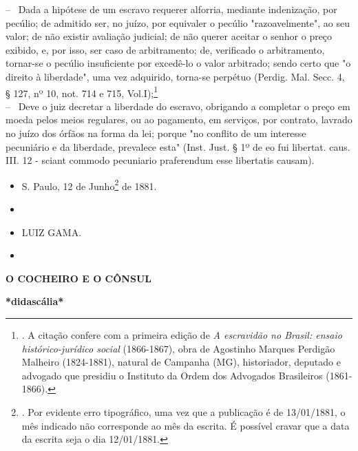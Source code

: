 -- ~Dada a hipótese de um escravo requerer alforria, mediante
indenização, por pecúlio; de admitido ser, no juízo, por equivaler o
pecúlio "razoavelmente", ao seu valor; de não existir avaliação
judicial; de não querer aceitar o senhor o preço exibido, e, por isso,
ser caso de arbitramento; de, verificado o arbitramento, tornar-se o
pecúlio insuficiente por excedê-lo o valor arbitrado; sendo certo que "o
direito à liberdade", uma vez adquirido, torna-se perpétuo (Perdig. Mal.
Secc. 4, § 127, nº 10, not. 714 e 715, Vol.I);\footnote{. A citação
  confere com a primeira edição de \emph{A escravidão no Brasil: ensaio
  histórico-jurídico social} (1866-1867), obra de Agostinho Marques
  Perdigão Malheiro (1824-1881), natural de Campanha (MG), historiador,
  deputado e advogado que presidiu o Instituto da Ordem dos Advogados
  Brasileiros (1861-1866).}\\
-- ~Deve o juiz decretar a liberdade do escravo, obrigando a completar o
preço em moeda pelos meios regulares, ou ao pagamento, em serviços, por
contrato, lavrado no juízo dos órfãos na forma da lei; porque "no
conflito de um interesse pecuniário e da liberdade, prevalece esta"
(Inst. Just. § 1º de eo fui libertat. caus. III. 12 - sciant commodo
pecuniario praferendum esse libertatis causam).

\begin{itemize}
\item
  S. Paulo, 12 de Junho\footnote{. Por evidente erro tipográfico, uma
    vez que a publicação é de 13/01/1881, o mês indicado não corresponde
    ao mês da escrita. É possível cravar que a data da escrita seja o
    dia 12/01/1881.} de 1881.
\item
\item
  LUIZ GAMA.
\item
\end{itemize}

\textbf{O COCHEIRO E O CÔNSUL}

\textbf{*didascália*}

